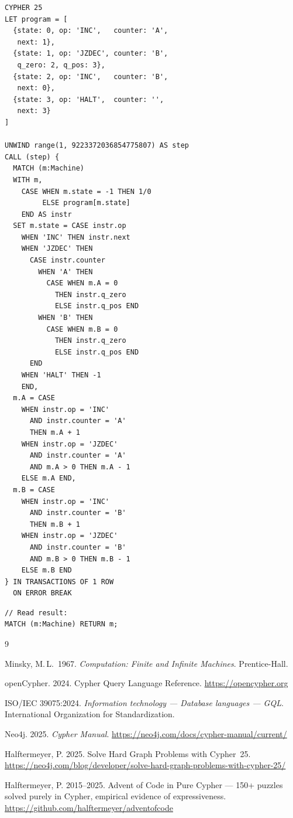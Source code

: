 \documentclass[sigconf, nonacm]{acmart}
\begin{document}
\vspace{-0.5em}

\begin{codeblock}
\begin{lstlisting}[style=cypher]
CYPHER 25
LET program = [
  {state: 0, op: 'INC',   counter: 'A',
   next: 1},
  {state: 1, op: 'JZDEC', counter: 'B',
   q_zero: 2, q_pos: 3},
  {state: 2, op: 'INC',   counter: 'B',
   next: 0},
  {state: 3, op: 'HALT',  counter: '',
   next: 3}
]

UNWIND range(1, 9223372036854775807) AS step
CALL (step) {
  MATCH (m:Machine)
  WITH m,
    CASE WHEN m.state = -1 THEN 1/0
         ELSE program[m.state]
    END AS instr
  SET m.state = CASE instr.op
    WHEN 'INC' THEN instr.next
    WHEN 'JZDEC' THEN
      CASE instr.counter
        WHEN 'A' THEN
          CASE WHEN m.A = 0
            THEN instr.q_zero
            ELSE instr.q_pos END
        WHEN 'B' THEN
          CASE WHEN m.B = 0
            THEN instr.q_zero
            ELSE instr.q_pos END
      END
    WHEN 'HALT' THEN -1
    END,
  m.A = CASE
    WHEN instr.op = 'INC'
      AND instr.counter = 'A'
      THEN m.A + 1
    WHEN instr.op = 'JZDEC'
      AND instr.counter = 'A'
      AND m.A > 0 THEN m.A - 1
    ELSE m.A END,
  m.B = CASE
    WHEN instr.op = 'INC'
      AND instr.counter = 'B'
      THEN m.B + 1
    WHEN instr.op = 'JZDEC'
      AND instr.counter = 'B'
      AND m.B > 0 THEN m.B - 1
    ELSE m.B END
} IN TRANSACTIONS OF 1 ROW
  ON ERROR BREAK
\end{lstlisting}
\end{codeblock}

\begin{codeblock}
\begin{lstlisting}[style=cypher]
// Read result:
MATCH (m:Machine) RETURN m;
\end{lstlisting}
\end{codeblock}


\begin{thebibliography}{9}

Minsky, M.\,L.\ 1967.
\emph{Computation: Finite and Infinite Machines}.
Prentice-Hall.

openCypher. 2024.
Cypher Query Language Reference.
\url{https://opencypher.org}

ISO/IEC 39075:2024.
\emph{Information technology --- Database languages --- GQL}.
International Organization for Standardization.

Neo4j. 2025.
\emph{Cypher Manual}.
\url{https://neo4j.com/docs/cypher-manual/current/}

Halftermeyer, P. 2025.
Solve Hard Graph Problems with Cypher~25.
\url{https://neo4j.com/blog/developer/solve-hard-graph-problems-with-cypher-25/}

Halftermeyer, P. 2015--2025.
Advent of Code in Pure Cypher ---
150+ puzzles solved purely in Cypher, empirical evidence of expressiveness.
\url{https://github.com/halftermeyer/adventofcode}

\end{thebibliography}
\end{document}
